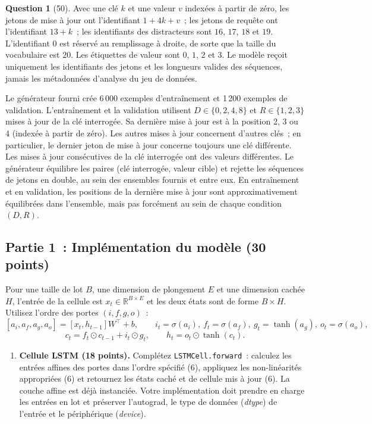 \documentclass[12pt]{article}
\theoremstyle{definition}
\newtheorem{exercise}{Question}%
\begin{document}
\begin{exercise}[50]
{Avec une clé $k$ et une valeur $v$ indexées à partir de zéro, les jetons de mise à jour ont l'identifiant $1+4k+v$~;
les jetons de requête ont l'identifiant $13+k$~; les identifiants des distracteurs sont $16$, $17$, $18$ et $19$.
L'identifiant $0$ est réservé au remplissage à droite, de sorte que la taille du vocabulaire est $20$. Les étiquettes
de valeur sont $0$, $1$, $2$ et $3$. Le modèle reçoit uniquement les identifiants des jetons et les longueurs valides
des séquences, jamais les métadonnées d'analyse du jeu de données.

Le générateur fourni crée 6\,000 exemples d'entraînement et 1\,200 exemples de validation. L'entraînement et la
validation utilisent $D\in\{0,2,4,8\}$ et $R\in\{1,2,3\}$ mises à jour de la clé interrogée. Sa dernière mise à jour
est à la position 2, 3 ou 4 (indexée à partir de zéro). Les autres mises à jour concernent d'autres clés~; en
particulier, le dernier jeton de mise à jour concerne toujours une clé différente. Les mises à jour consécutives de la
clé interrogée ont des valeurs différentes. Le générateur équilibre les paires (clé interrogée, valeur cible) et
rejette les séquences de jetons en double, au sein des ensembles fournis et entre eux. En entraînement et en
validation, les positions de la dernière mise à jour sont approximativement équilibrées dans l'ensemble, mais pas
forcément au sein de chaque condition $(D,R)$.

\subsection*{Partie 1~: Implémentation du modèle (30 points)}
Pour une taille de lot $B$, une dimension de plongement $E$ et une dimension cachée $H$, l'entrée de la cellule est
$x_t\in\mathbb{R}^{B\times E}$ et les deux états sont de forme $B\times H$. Utilisez l'ordre des portes
$(i,f,g,o)$~:
\[
 [a_i,a_f,a_g,a_o]=[x_t,h_{t-1}]W^\top+b,
 \qquad i_t=\sigma(a_i),\ f_t=\sigma(a_f),\ g_t=\tanh(a_g),\ o_t=\sigma(a_o),
\]
\[
 c_t=f_t\odot c_{t-1}+i_t\odot g_t,
 \qquad h_t=o_t\odot\tanh(c_t).
\]
\begin{enumerate}
\item \textbf{Cellule LSTM (18 points).} Complétez \texttt{LSTMCell.forward}~: calculez les entrées affines des
portes dans l'ordre spécifié (6), appliquez les non-linéarités appropriées (6) et retournez les états caché et de
cellule mis à jour (6). La couche affine est déjà instanciée. Votre implémentation doit prendre en charge les entrées
en lot et préserver l'autograd, le type de données (\emph{dtype}) de l'entrée et le périphérique (\emph{device}).


\end{enumerate}}
\end{exercise}
\end{document}
